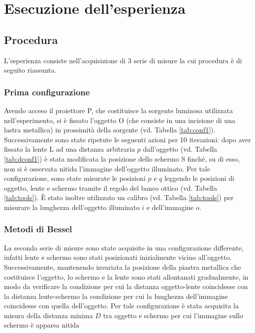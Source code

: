 \documentclass[11pt,a4paper]{article}
\begin{document}
\section{Esecuzione dell’esperienza}

\subsection{Procedura}
L'esperienza consiste nell'acquisizione di 3 serie di misure la cui procedura è di seguito riassunta.

\subsubsection{Prima configurazione}

Avendo acceso il proiettore P, che costituisce la sorgente luminosa utilizzata nell'esperimento, si è fissato l'oggetto O (che consiste in una incisione di una lastra metallica) in prossimità della sorgente (vd. Tabella \ref{tab:conf1}). Successivamente sono state ripetute le seguenti azioni per 10 iterazioni: dopo aver fissato la lente L ad una distanza arbitraria $p$ dall'oggetto (vd. Tabella \ref{tab:dconf1}) è stata modificata la posizione dello schermo S finché, su di esso, non si è osservata nitida l'immagine dell'oggetto illuminato. Per tale configurazione, sono state misurate le posizioni $p$ e $q$ leggendo le posizioni di oggetto, lente e schermo tramite il regolo del banco ottico (vd. Tabella \ref{tab:tools}). È stato inoltre utilizzato un calibro (vd. Tabella \ref{tab:tools}) per misurare la lunghezza dell'oggetto illuminato $i$ e dell'immagine $o$.

\subsubsection{Metodi di Bessel}
La seconda serie di misure sono state acquisite in una configurazione differente, infatti lente e schermo sono stati posizionati inizialmente vicino all'oggetto. Successivamente, mantenendo invariata la posizione della piastra metallica che costituisce l'oggetto, lo schermo e la lente sono stati allontanati gradualmente, in modo da verificare la condizione per cui la distanza oggetto-lente coincidesse con la distanza lente-schermo la condizione per cui la lunghezza dell'immagine coincidesse con quella dell'oggetto. Per tale configurazione è stata acquisita la misura della distanza minima $D$ tra oggetto e schermo per cui l'immagine sullo schermo è apparsa nitida
\end{document}
